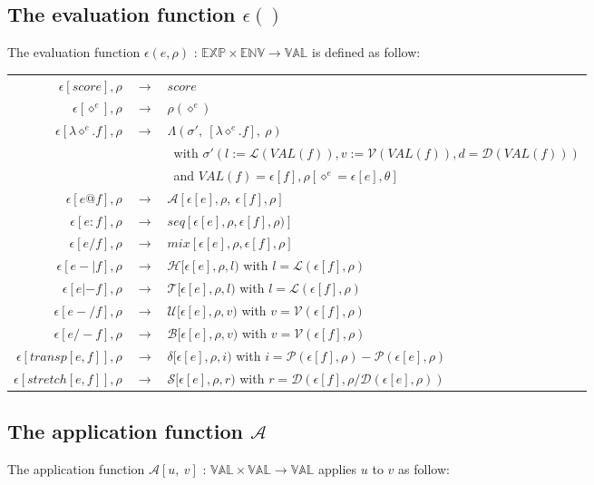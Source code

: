 \documentclass[10pt,a4paper,frenchb]{article}
\makeatletter
\newcommand{\var}[1]	{\ensuremath{\diamond^#1}}
\newcommand{\expr}		{\ensuremath{\mathbb{EXP}}}
\newcommand{\val}		{\ensuremath{\mathbb{VAL}}}
\newcommand{\env}		{\ensuremath{\mathbb{ENV}}}
\newcommand{\closure}	{\ensuremath{\Lambda}}
\newcommand{\applyop}	{\ensuremath{@}}
\newcommand{\sdomain}[3]{$#1 \times #2 \rightarrow #3$}
\newcommand{\evalsym}			{\ensuremath{\epsilon}}
\newcommand{\envsym}			{\ensuremath{\rho}}
\newcommand{\emptyenv}		{\ensuremath{\theta}}
\newcommand{\applysym}		{\ensuremath{\mathcal A}}
\newcommand{\closenv}[2][f]		{\closure(#2,\ [\lambda \var{e}.#1],\ \envsym)}
\newcommand{\evalsimpleshort}[1]		{\evalsym\left[#1\right]}
\newcommand{\evalsimple}[1]			{\evalsym\left[#1\right],\rho}
\newcommand{\applysimple}	[2]			{\applysym\left[#1,\ #2\right]}
\newcommand{\opexpr}[1] 	{e #1 f}
\newcommand{\lambdaexpr}	{\lambda \var{e}.f}
\newcommand{\ra}	{\ensuremath{\rightarrow}}
\newcommand{\seq}			{:}
\newcommand{\mix}			{/}
\newcommand{\length}		{\ensuremath{\mathcal L}}
\newcommand{\voices}		{\ensuremath{\mathcal V}}
\newcommand{\pitch}		{\ensuremath{\mathcal P}}
\newcommand{\dur}			{\ensuremath{\mathcal D}}
\newcommand{\head}			{\ensuremath{\mathcal H}}
\newcommand{\tail}			{\ensuremath{\mathcal T}}
\renewcommand{\top}		{\ensuremath{\mathcal U}}
\newcommand{\bottom}		{\ensuremath{\mathcal B}}
\newcommand{\transp}		{\ensuremath{\delta}}
\renewcommand{\stretch}	{\ensuremath{\mathcal S}}
\newcommand{\bounds}		{\ensuremath{\sigma}}
\newcommand{\evaltable}[1][$\rightarrow$]	  {\begin{center} \begin{tabular*}{0.9\linewidth}{rc@{ #1 }l}}
\newcommand{\evaltablend}  		{\end{tabular*}\end{center}}
\newcommand{\evalspace}	  		{\vspace{2mm}\\}
\makeatother
\begin{document}
\subsection{The evaluation function $\evalsym()$}
\label{evalsimple}

The evaluation function $\evalsym(e,\envsym)$ : \sdomain{\expr}{\env}{\val} is defined as follow:

\evaltable[]
 \hline
 $\evalsimple{score}$			& \ra & $score$ \\
 $\evalsimple{\var{e}}$ 		& \ra & $\envsym(\var{e})$ \\
 $\evalsimple{\lambdaexpr}$ 	& \ra & $\closenv{\bounds'}$ \\
 								& & \ with $\bounds'(l:=\length(VAL(f)), v:=\voices(VAL(f)), d=\dur(VAL(f)))$ \\
			 			& & \ and $VAL(f) = \evalsimpleshort{f},\envsym[\var{e}= \evalsimpleshort{e}, \emptyenv]$\\
 $\evalsimple{\opexpr{\applyop}}$ 	& \ra & $\applysimple{\evalsimple{e}}{\evalsimple{f}}$
\evalspace
 $\evalsimple{\opexpr{\seq}}$	& \ra & $seq[\evalsimple{e}, \evalsimple{f})]$ \\
 $\evalsimple{\opexpr{\mix}}$ 	& \ra & $mix[\evalsimple{e}, \evalsimple{f}]$ \\
 $\evalsimple{\opexpr{-|}}$ 		& \ra & $\head [\evalsimple{e},l)$ with $l = \length(\evalsimple{f})$ \\
 $\evalsimple{\opexpr{|-}}$ 		& \ra & $\tail [\evalsimple{e},l)$ with $l = \length(\evalsimple{f})$ \\
 $\evalsimple{\opexpr{-/}}$ 		& \ra & $\top [\evalsimple{e},v)$ with $v = \voices(\evalsimple{f})$ \\
 $\evalsimple{\opexpr{/-}}$ 		& \ra & $\bottom [\evalsimple{e},v)$ with $v = \voices(\evalsimple{f})$ \\
 $\evalsimple{transp[e,f]}$ 		& \ra & $\transp [\evalsimple{e},i)$ with $i = \pitch(\evalsimple{f}) - \pitch(\evalsimple{e}) $ \\
 $\evalsimple{stretch[e,f]}$ 	& \ra & $\stretch [\evalsimple{e},r)$ with $r = \dur(\evalsimple{f} / \dur(\evalsimple{e}))$ \\
 \hline
\evaltablend

\subsection{The application function $\applysym{}$}
The application function $\applysimple{u}{v}$ : \sdomain{\val}{\val}{\val} applies $u$ to $v$ as follow:
\end{document}

